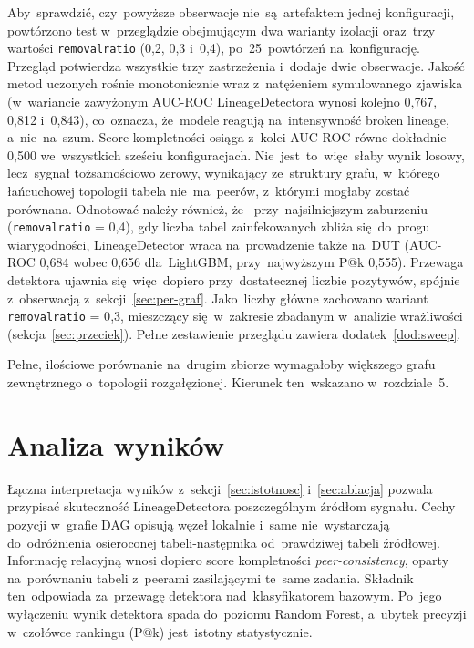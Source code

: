 \documentclass[polish,master,a4paper,oneside]{ppfcmthesis}
\renewcommand{\_}{\origtextunderscore\ifmmode\else\allowbreak\fi}
\begin{document}
Aby~sprawdzić, czy~powyższe obserwacje nie~są~artefaktem jednej konfiguracji,
powtórzono test w~przeglądzie obejmującym dwa warianty izolacji oraz~trzy
wartości \texttt{removal\_ratio} (0{,}2, 0{,}3 i~0{,}4), po~25~powtórzeń
na~konfigurację. Przegląd potwierdza wszystkie trzy zastrzeżenia i~dodaje
dwie obserwacje. Jakość metod uczonych rośnie monotonicznie
wraz z~natężeniem symulowanego zjawiska (w~wariancie zawyżonym AUC-ROC
LineageDetectora wynosi kolejno 0{,}767, 0{,}812 i~0{,}843), co~oznacza,
że~modele reagują na~intensywność broken lineage, a~nie~na~szum. Score
kompletności osiąga z~kolei AUC-ROC równe dokładnie 0{,}500 we~wszystkich sześciu
konfiguracjach. Nie~jest~to~więc~słaby wynik losowy, lecz~sygnał tożsamościowo
zerowy, wynikający ze~struktury grafu, w~którego łańcuchowej topologii tabela
nie~ma~peerów, z~którymi mogłaby zostać porównana. Odnotować należy również, że~
przy~najsilniejszym zaburzeniu (\texttt{removal\_ratio} = 0{,}4), gdy liczba
tabel zainfekowanych zbliża się~do~progu wiarygodności, LineageDetector wraca
na~prowadzenie także na~DUT (AUC-ROC 0{,}684 wobec 0{,}656 dla~LightGBM,
przy~najwyższym P@k 0{,}555). Przewaga detektora ujawnia się~więc~dopiero
przy~dostatecznej liczbie pozytywów, spójnie z~obserwacją
z~sekcji~\ref{sec:per-graf}. Jako~liczby główne zachowano wariant
\texttt{removal\_ratio} = 0{,}3, mieszczący się~w~zakresie zbadanym w~analizie
wrażliwości (sekcja~\ref{sec:przeciek}). Pełne zestawienie przeglądu zawiera
dodatek~\ref{dod:sweep}.

Pełne, ilościowe porównanie na~drugim zbiorze wymagałoby większego grafu
zewnętrznego o~topologii rozgałęzionej. Kierunek ten~wskazano w~rozdziale~5.

\section{Analiza wyników}
\label{sec:analiza}

Łączna interpretacja wyników z~sekcji~\ref{sec:istotnosc} i~\ref{sec:ablacja}
pozwala przypisać skuteczność LineageDetectora poszczególnym źródłom sygnału.
Cechy pozycji w~grafie DAG opisują węzeł lokalnie i~same nie~wystarczają
do~odróżnienia osieroconej tabeli-następnika od~prawdziwej tabeli źródłowej.
Informację relacyjną wnosi dopiero score kompletności \emph{peer-consistency},
oparty na~porównaniu tabeli z~peerami zasilającymi te~same zadania. Składnik
ten~odpowiada za~przewagę detektora nad~klasyfikatorem bazowym. Po~jego
wyłączeniu wynik detektora spada do~poziomu Random Forest, a~ubytek precyzji
w~czołówce rankingu (P@k) jest~istotny statystycznie.
\end{document}
